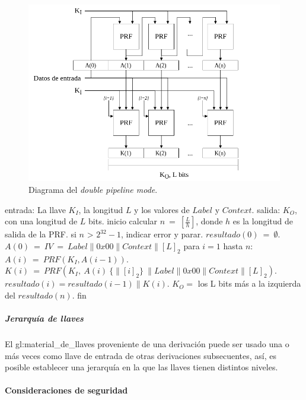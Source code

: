 \begin{figure}
  \begin{center}
    \includegraphics[width=0.75\linewidth]{diagramas/dpipeline_mode}
    \caption{Diagrama del \textit{double pipeline mode}.}
    \label{diagrama_dpipeline_mode}
   \end{center}
\end{figure}

\begin{pseudocodigo}[caption={Funcionamiento del \textit{double pipeline mode}.},
label={mi:3}]
    entrada:   La llave $K_I$, la longitud $L$ y los valores de $Label$ y $Context$.
    salida:    $K_O$, con una longitud de $L$ bits.
    inicio
      calcular $n\: =\: [\frac{L}{h}]$, donde $h$ es la longitud de salida de la PRF.
      si $n$ > $2^{32}-1$, indicar error y parar.
      $resultado(0)\: =\: \emptyset$.
      $A(0)\: =\: IV\: =\: Label \parallel 0x00 \parallel Context \parallel {[L]}_2$
      para $i=1$ hasta $n$:
        $A(i)\: =\: PRF(K_I, A(i-1))$.
        $K(i)\: =\: PRF(K_I,\: A(i)\: \{\parallel {[i]}_2\}\: \parallel Label \parallel 0x00 \parallel Context \parallel {[L]}_2)$.
        $resultado(i) = resultado(i-1) \parallel K(i)$.
      $K_O =$ los L bits más a la izquierda del $resultado(n)$.
    fin
\end{pseudocodigo}

\subparagraph{Jerarquía de llaves}
El \gls{gl:material_de_llaves} proveniente de una derivación puede ser usado
una o más veces como llave de entrada de otras derivaciones subsecuentes, así,
es posible establecer una jerarquía en la que las llaves tienen distintos
niveles.

\paragraph{Consideraciones de seguridad}

